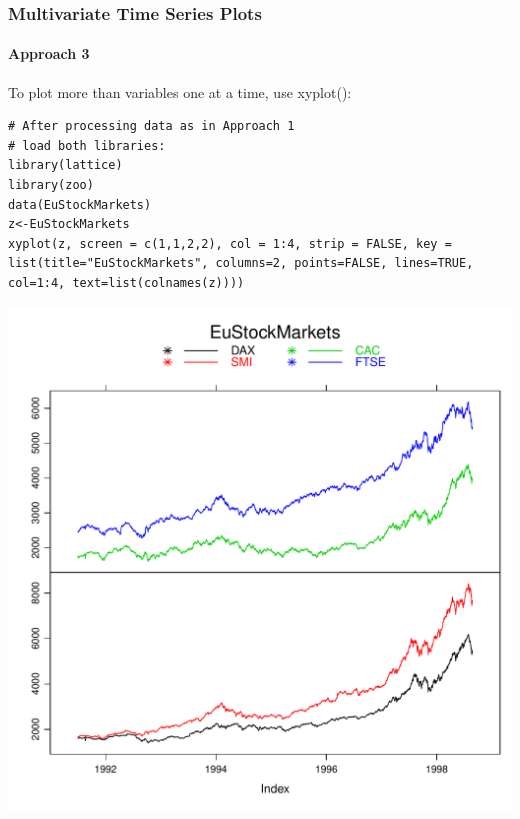 \begin{frame}
 \frametitle{Multivariate Time Series Plots}
 \framesubtitle{Approach 3}

To plot more than variables one at a time, use \ttfamily xyplot(): \normalfont
		\begin{lstlisting}
# After processing data as in Approach 1
# load both libraries:
library(lattice)
library(zoo)
data(EuStockMarkets)
z<-EuStockMarkets
xyplot(z, screen = c(1,1,2,2), col = 1:4, strip = FALSE, key = list(title="EuStockMarkets", columns=2, points=FALSE, lines=TRUE, col=1:4, text=list(colnames(z))))
		\end{lstlisting}

       \begin{center}
         \includegraphics[scale=0.37]{images/stockPlot2.pdf}
        \end{center}
\end{frame}
%


